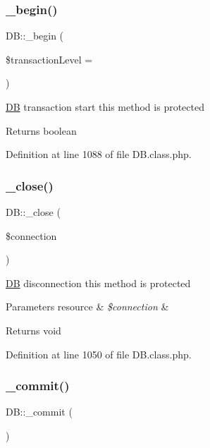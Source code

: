 \subsubsection{\texorpdfstring{\+\_\+begin()}{\_begin()}}
{\footnotesize\ttfamily D\+B\+::\+\_\+begin (\begin{DoxyParamCaption}\item[{}]{\$transaction\+Level = {} }\end{DoxyParamCaption})}

\hyperlink{classDB}{DB} transaction start this method is protected \begin{DoxyReturn}{Returns}
boolean 
\end{DoxyReturn}


Definition at line 1088 of file D\+B.\+class.\+php.

\hypertarget{classDB_a8c161612a558f47fb008dec4b46ee05c}{}\label{classDB_a8c161612a558f47fb008dec4b46ee05c} 
\subsubsection{\texorpdfstring{\+\_\+close()}{\_close()}}
{\footnotesize\ttfamily D\+B\+::\+\_\+close (\begin{DoxyParamCaption}\item[{}]{\$connection }\end{DoxyParamCaption})}

\hyperlink{classDB}{DB} disconnection this method is protected 
\begin{DoxyParams}[1]{Parameters}
resource & {\em \$connection} & \\
\hline
\end{DoxyParams}
\begin{DoxyReturn}{Returns}
void 
\end{DoxyReturn}


Definition at line 1050 of file D\+B.\+class.\+php.

\hypertarget{classDB_ae6b44dc80d78b7f73cb6741ff0d63399}{}\label{classDB_ae6b44dc80d78b7f73cb6741ff0d63399} 
\subsubsection{\texorpdfstring{\+\_\+commit()}{\_commit()}}
{\footnotesize\ttfamily D\+B\+::\+\_\+commit (\begin{DoxyParamCaption}{ }\end{DoxyParamCaption})}

